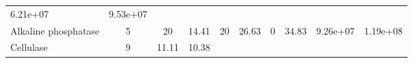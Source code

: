 \documentclass[]{article}
\begin{document}
\begin{longtable}[]{@{}lccccccccc@{}}
\begin{minipage}[t]{0.08\columnwidth}
6.21e+07\strut
\end{minipage} & \begin{minipage}[t]{0.08\columnwidth}\centering\strut
9.53e+07\strut
\end{minipage}\tabularnewline
\begin{minipage}[t]{0.07\columnwidth}\raggedright\strut
Alkaline phosphatase\strut
\end{minipage} & \begin{minipage}[t]{0.06\columnwidth}\centering\strut
5\strut
\end{minipage} & \begin{minipage}[t]{0.08\columnwidth}\centering\strut
20\strut
\end{minipage} & \begin{minipage}[t]{0.08\columnwidth}\centering\strut
14.41\strut
\end{minipage} & \begin{minipage}[t]{0.08\columnwidth}\centering\strut
20\strut
\end{minipage} & \begin{minipage}[t]{0.08\columnwidth}\centering\strut
26.63\strut
\end{minipage} & \begin{minipage}[t]{0.08\columnwidth}\centering\strut
0\strut
\end{minipage} & \begin{minipage}[t]{0.08\columnwidth}\centering\strut
34.83\strut
\end{minipage} & \begin{minipage}[t]{0.08\columnwidth}\centering\strut
9.26e+07\strut
\end{minipage} & \begin{minipage}[t]{0.08\columnwidth}\centering\strut
1.19e+08\strut
\end{minipage}\tabularnewline
\begin{minipage}[t]{0.07\columnwidth}\raggedright\strut
Cellulase\strut
\end{minipage} & \begin{minipage}[t]{0.06\columnwidth}\centering\strut
9\strut
\end{minipage} & \begin{minipage}[t]{0.08\columnwidth}\centering\strut
11.11\strut
\end{minipage} & \begin{minipage}[t]{0.08\columnwidth}\centering\strut
10.38\strut
\end{minipage} & \begin{minipage}[t]{0.08\columnwidth}\centering\strut

\end{minipage}
\end{longtable}
\end{document}
